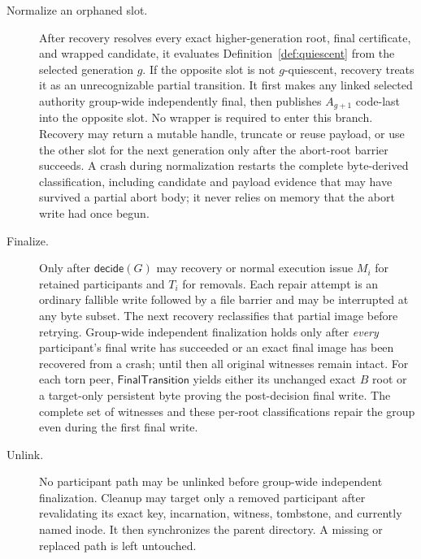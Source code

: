 \documentclass[10pt,twocolumn]{article}
\theoremstyle{remark}
\begin{document}
\begin{description}
  \item[Normalize an orphaned slot.] After recovery resolves every exact higher-generation root,
  final certificate, and wrapped candidate, it evaluates Definition~\ref{def:quiescent} from the
  selected generation $g$. If the opposite slot is not $g$-quiescent, recovery treats it as an
  unrecognizable partial transition. It first makes any linked selected authority group-wide
  independently final, then publishes $A_{g+1}$ code-last into the opposite slot. No wrapper is required
  to enter this branch. Recovery may return a mutable handle, truncate or reuse payload, or use the
  other slot for the next generation only after the abort-root barrier succeeds. A crash during
  normalization restarts the complete byte-derived classification, including candidate and payload
  evidence that may have survived a partial abort body; it never relies on memory that the abort
  write had once begun.

  \item[Finalize.] Only after $\mathsf{decide}(G)$ may recovery or normal execution issue $M_i$ for
  retained participants and $T_i$ for removals. Each repair attempt is an ordinary fallible write
  followed by a file barrier and may be interrupted at any byte subset. The next recovery
  reclassifies that partial image before retrying. Group-wide independent finalization holds only
  after \emph{every} participant's final write has succeeded or an exact final image has been
  recovered from a crash; until then all original witnesses remain intact. For each torn peer,
  $\mathsf{FinalTransition}$ yields either its unchanged exact $B$ root or a target-only persistent
  byte proving the post-decision final write. The complete set of witnesses and these per-root
  classifications repair the group even during the first final write.

  \item[Unlink.] No participant path may be unlinked before group-wide independent finalization.
  Cleanup may target only a removed participant after revalidating its exact key, incarnation,
  witness, tombstone, and currently named inode. It then synchronizes the parent directory. A
  missing or replaced path is left untouched.


\end{description}
\end{document}
